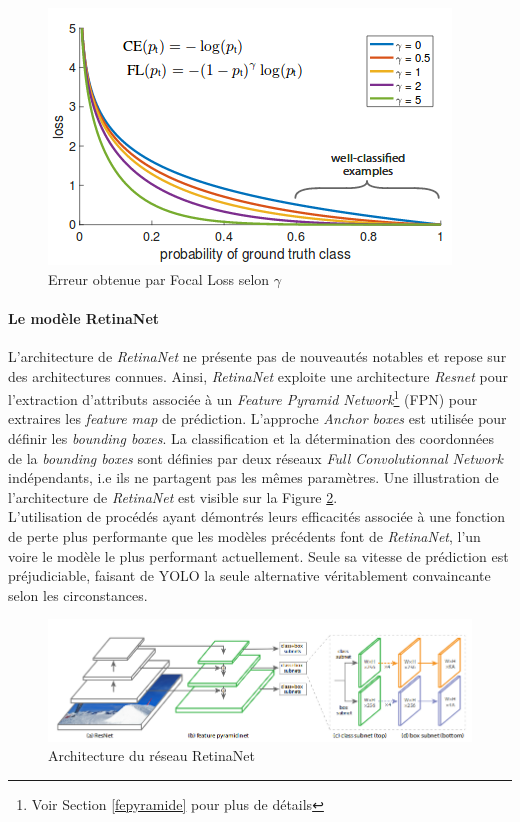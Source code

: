 \begin{figure}
\centering
\includegraphics[scale=0.4]{./tex/computer-vision/sota/focallosspic.png}
\caption{Erreur obtenue par Focal Loss selon $\gamma$}
\label{focallosscurve}
\end{figure}

\paragraph{Le modèle RetinaNet}
L'architecture de \textit{RetinaNet} ne présente pas de nouveautés notables et repose sur des architectures connues. Ainsi, \textit{RetinaNet} exploite une architecture \textit{Resnet} pour l'extraction d'attributs associée à un \textit{Feature Pyramid Network}\footnote{Voir Section \ref{fepyramide} pour plus de détails} (FPN) pour extraires les \textit{feature map} de prédiction. L'approche \textit{Anchor boxes} est utilisée pour définir les \textit{bounding boxes}. La classification et la détermination des coordonnées de la \textit{bounding boxes} sont définies par deux réseaux \textit{Full Convolutionnal Network} indépendants, i.e ils ne partagent pas les mêmes paramètres. Une illustration de l'architecture de \textit{RetinaNet} est visible sur la Figure \ref{retinanetfig}.\\

\noindent L'utilisation de procédés ayant démontrés leurs efficacités associée à une fonction de perte plus performante que les modèles précédents font de \textit{RetinaNet}, l'un voire le modèle le plus performant actuellement. Seule sa vitesse de prédiction est préjudiciable, faisant de YOLO la seule alternative véritablement convaincante selon les circonstances.

\begin{figure}
\centering
\includegraphics[scale=0.4]{./tex/computer-vision/sota/retinanetpic.png}
\caption{Architecture du réseau RetinaNet}
\label{retinanetfig}
\end{figure}

